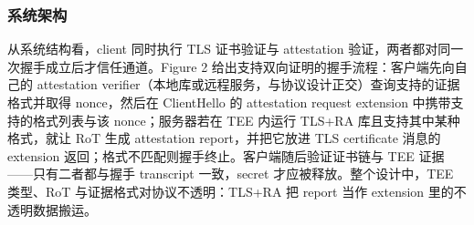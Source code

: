 \documentclass[11pt]{ctexart}
\begin{document}
\subsubsection{系统架构}
从系统结构看，client 同时执行 TLS 证书验证与 attestation 验证，两者都对同一次握手成立后才信任通道。Figure 2 给出支持双向证明的握手流程：客户端先向自己的 attestation verifier（本地库或远程服务，与协议设计正交）查询支持的证据格式并取得 nonce，然后在 ClientHello 的 attestation request extension 中携带支持的格式列表与该 nonce；服务器若在 TEE 内运行 TLS+RA 库且支持其中某种格式，就让 RoT 生成 attestation report，并把它放进 TLS certificate 消息的 extension 返回；格式不匹配则握手终止。客户端随后验证证书链与 TEE 证据——只有二者都与握手 transcript 一致，secret 才应被释放。整个设计中，TEE 类型、RoT 与证据格式对协议不透明：TLS+RA 把 report 当作 extension 里的不透明数据搬运。\par
\end{document}
